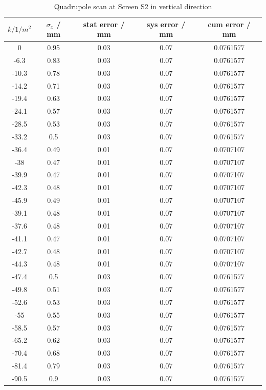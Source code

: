 \documentclass[11pt,a4paper,notitlepage]{scrartcl}
\begin{document}
\begin{table}[htbp]
	\centering
	\begin{tabular}{c|c|c|c|c}
		$k / 1/m^2$ & $\sigma_x$ / mm & stat error / mm & sys error / mm & cum error / mm \\
		\hline
		\hline
		0     & 0.95 & 0.03 & 0.07 & 0.0761577 \\
		-6.3  & 0.83 & 0.03 & 0.07 & 0.0761577 \\
		-10.3 & 0.78 & 0.03 & 0.07 & 0.0761577 \\
		-14.2 & 0.71 & 0.03 & 0.07 & 0.0761577 \\
		-19.4 & 0.63 & 0.03 & 0.07 & 0.0761577 \\
		-24.1 & 0.57 & 0.03 & 0.07 & 0.0761577 \\
		-28.5 & 0.53 & 0.03 & 0.07 & 0.0761577 \\
		-33.2 & 0.5  & 0.03 & 0.07 & 0.0761577 \\
		-36.4 & 0.49 & 0.01 & 0.07 & 0.0707107 \\
		-38   & 0.47 & 0.01 & 0.07 & 0.0707107 \\
		-39.9 & 0.47 & 0.01 & 0.07 & 0.0707107 \\
		-42.3 & 0.48 & 0.01 & 0.07 & 0.0707107 \\
		-45.9 & 0.49 & 0.01 & 0.07 & 0.0707107 \\
		-39.1 & 0.48 & 0.01 & 0.07 & 0.0707107 \\
		-37.6 & 0.48 & 0.01 & 0.07 & 0.0707107 \\
		-41.1 & 0.47 & 0.01 & 0.07 & 0.0707107 \\
		-42.7 & 0.48 & 0.01 & 0.07 & 0.0707107 \\
		-44.3 & 0.48 & 0.01 & 0.07 & 0.0707107 \\
		-47.4 & 0.5  & 0.03 & 0.07 & 0.0761577 \\
		-49.8 & 0.51 & 0.03 & 0.07 & 0.0761577 \\
		-52.6 & 0.53 & 0.03 & 0.07 & 0.0761577 \\
		-55   & 0.55 & 0.03 & 0.07 & 0.0761577 \\
		-58.5 & 0.57 & 0.03 & 0.07 & 0.0761577 \\
		-65.2 & 0.62 & 0.03 & 0.07 & 0.0761577 \\
		-70.4 & 0.68 & 0.03 & 0.07 & 0.0761577 \\
		-81.4 & 0.79 & 0.03 & 0.07 & 0.0761577 \\
		-90.5 & 0.9  & 0.03 & 0.07 & 0.0761577
	\end{tabular}
\caption{Quadrupole scan at Screen S2 in vertical direction}
\label{tab:qscan2z}
\end{table}


\newpage
\printbibliography[heading=bibintoc]
\end{document}
